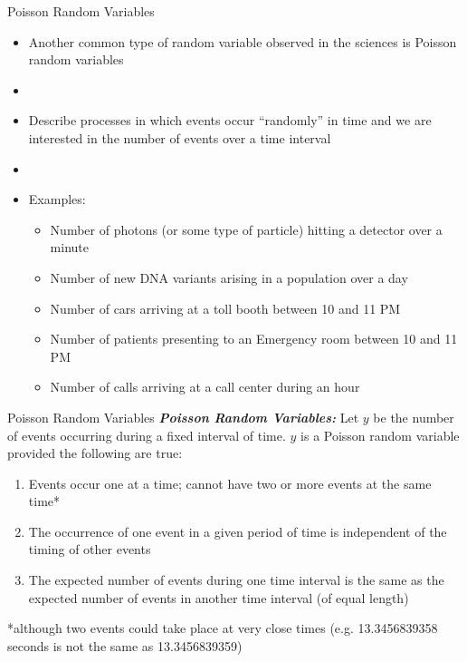 \documentclass[xcolor=dvipsnames]{beamer}
\begin{document}
\begin{frame}{Poisson Random Variables}
	\begin{itemize}
		\item Another common type of random variable observed in the sciences is Poisson random variables
		\item[]
		\item Describe processes in which events occur ``randomly'' in time and we are interested in the number of events over a time interval
		\item[]
		\item Examples: 
		\begin{itemize}
			\item Number of photons (or some type of particle) hitting a detector over a minute
			\item Number of new DNA variants arising in a population over a day
			\item Number of cars arriving at a toll booth between 10 and 11 PM
			\item Number of patients presenting to an Emergency room between 10 and 11 PM
			\item Number of calls arriving at a call center during an hour
		\end{itemize}
	\end{itemize}
\end{frame}

\begin{frame}{Poisson Random Variables}
	\textbf{\emph{Poisson Random Variables:}} Let $y$ be the number of events occurring during a fixed interval of time. $y$ is a Poisson random variable provided the following are true:
		\begin{enumerate}
			\item Events occur one at a time; cannot have two or more events at the same time*
			\item The occurrence of one event in a given period of time is independent of the timing of other events
			\item The expected number of events during one time interval is the same as the expected number of events in another time interval (of equal length)
		\end{enumerate}
		{\tiny
			*although two events could take place at very close times (e.g. 13.3456839358 seconds is not the same as 13.3456839359)}
\end{frame}
\end{document}
